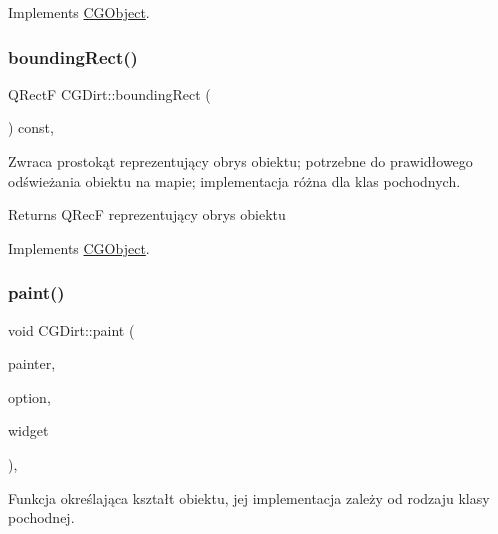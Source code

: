 Implements \mbox{\hyperlink{class_c_g_object_a859e765fbb3ab0d6ad73ca58e5e49779}{C\+G\+Object}}.

\mbox{\label{class_c_g_dirt_aa7ff4b489e4fdbdaa456b40394b635f1}} 
\subsubsection{\texorpdfstring{bounding\+Rect()}{boundingRect()}}
{\footnotesize\ttfamily Q\+RectF C\+G\+Dirt\+::bounding\+Rect (\begin{DoxyParamCaption}{ }\end{DoxyParamCaption}) const\hspace{0.3cm}{\ttfamily [override]}, {\ttfamily [virtual]}}



Zwraca prostokąt reprezentujący obrys obiektu; potrzebne do prawidłowego odświeżania obiektu na mapie; implementacja różna dla klas pochodnych. 

\begin{DoxyReturn}{Returns}
Q\+RecF reprezentujący obrys obiektu 
\end{DoxyReturn}


Implements \mbox{\hyperlink{class_c_g_object_ab9edf3d10a53c254cdb5d3d8de930207}{C\+G\+Object}}.

\mbox{\label{class_c_g_dirt_a46b019eb8693b85447149170178f8643}} 
\subsubsection{\texorpdfstring{paint()}{paint()}}
{\footnotesize\ttfamily void C\+G\+Dirt\+::paint (\begin{DoxyParamCaption}\item[{Q\+Painter $\ast$}]{painter,  }\item[{const Q\+Style\+Option\+Graphics\+Item $\ast$}]{option,  }\item[{Q\+Widget $\ast$}]{widget }\end{DoxyParamCaption})\hspace{0.3cm}{\ttfamily [override]}, {\ttfamily [virtual]}}



Funkcja określająca kształt obiektu, jej implementacja zależy od rodzaju klasy pochodnej. 


